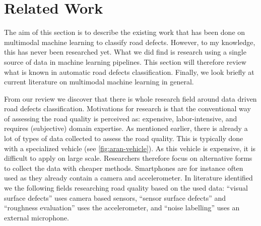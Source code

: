 \clearpage
\section{Related Work}
\label{sec:related-work}

The aim of this section is to describe the existing work that has been done on multimodal machine learning to classify road defects. However, to my knowledge, this has never been researched yet. What we did find is research using a single source of data in machine learning pipelines. This section will therefore review what is known in automatic road defects classification. Finally, we look briefly at current literature on multimodal machine learning in general.



From our review we discover that there is whole research field around data driven road defects classification. Motivations for research is that the conventional way of assessing the road quality is perceived as: expensive, labor-intensive, and requires (subjective) domain expertise. As mentioned earlier, there is already a lot of types of data collected to assess the road quality. This is typically done with a specialized vehicle (see \ref{fig:aran-vehicle}). As this vehicle is expensive, it is difficult to apply on large scale. Researchers therefore focus on alternative forms to collect the data with cheaper methods. Smartphones are for instance often used as they already contain a camera and accelerometer. In literature identified we the following fields researching road quality based on the used data: ``visual surface defects'' uses camera based sensors, ``sensor surface defects'' and ``roughness evaluation'' uses the accelerometer, and ``noise labelling'' uses an external microphone.

